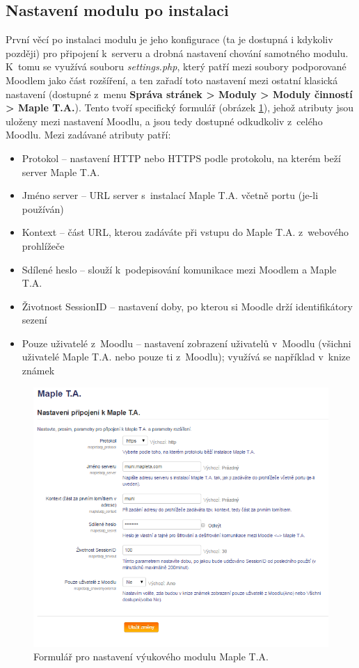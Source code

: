 \documentclass[
print,
  11pt,
  table,   
  nolof,    
  nolot,
  oneside,final
]{fithesis3}
\begin{document}
\subsection{Nastavení modulu po instalaci}
První věcí po instalaci modulu je jeho konfigurace (ta je dostupná i kdykoliv později) pro připojení k~serveru a drobná nastavení chování samotného modulu. K~tomu se využívá souboru \emph{settings.php}, který patří mezi soubory podporované Moodlem jako část rozšíření, a ten zařadí toto nastavení mezi ostatní klasická nastavení (dostupné z~menu \textbf{Správa stránek > Moduly > Moduly činností > Maple T.A.}). Tento tvoří specifický formulář (obrázek \ref{fig:maplesettings}), jehož atributy jsou uloženy mezi nastavení Moodlu, a jsou tedy dostupné odkudkoliv z~celého Moodlu. Mezi zadávané atributy patří:
\begin{itemize}

\item Protokol -- nastavení HTTP nebo HTTPS podle protokolu, na kterém beží server Maple T.A.
\item Jméno server -- URL server s~instalací Maple T.A. včetně portu (je-li používán)
\item Kontext -- část URL, kterou zadáváte při vstupu do Maple T.A. z~webového prohlížeče
\item Sdílené heslo -- slouží k~podepisování komunikace mezi Moodlem a Maple T.A.
\item Životnost SessionID -- nastavení doby, po kterou si Moodle drží identifikátory sezení
\item Pouze uživatelé z~Moodlu -- nastavení zobrazení uživatelů v~Moodlu (všichni uživatelé Maple T.A. nebo pouze ti z~Moodlu); využívá se například v~knize známek
\end{itemize}
		\begin{figure}[htb]
		  \begin{center}
		    \includegraphics[width=120mm]{images/maple_settings.png}
		   \end{center}
		  \caption{Formulář pro nastavení výukového modulu Maple T.A.}
		  \label{fig:maplesettings}
		\end{figure}
\end{document}
